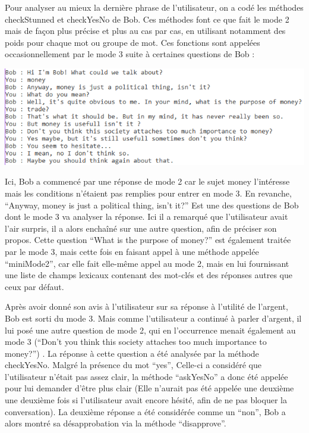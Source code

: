 \documentclass[paper=a4, 12pt]{report}
\begin{document}
\vspace{0.5cm}

Pour analyser au mieux la dernière phrase de l’utilisateur, on a codé les méthodes checkStunned et checkYesNo de Bob. Ces méthodes font ce que fait le mode 2 mais de façon plus précise et plus au cas par cas, en utilisant notamment des poids pour chaque mot ou groupe de mot. Ces fonctions sont appelées occasionnellement par le mode 3 suite à certaines questions de Bob :

\vspace{0.5cm}

\includegraphics[scale=0.5]{screen1.png}

\vspace{0.5cm}

Ici, Bob a commencé par une réponse de mode 2 car le sujet money l’intéresse mais les conditions n’étaient pas remplies pour entrer en mode 3. En revanche, “Anyway, money is just a political thing, isn’t it?” Est une des questions de Bob dont le mode 3 va analyser la réponse. Ici il a remarqué que l’utilisateur avait l’air surpris, il a alors enchaîné sur une autre question, afin de préciser son propos. Cette question “What is the purpose of money?” est également traitée par le mode 3, mais cette fois en faisant appel à une méthode appelée “miniMode2”, car elle fait elle-même appel au mode 2, mais en lui fournissant une liste de champs lexicaux contenant des mot-clés et des réponses autres que ceux par défaut.

\vspace{0.5cm}

Après avoir donné son avis à l’utilisateur sur sa réponse à l’utilité de l’argent, Bob est sorti du mode 3. Mais comme l’utilisateur a continué à parler d’argent, il lui posé une autre question de mode 2, qui en l’occurrence menait également au mode 3 (“Don’t you think this society attaches too much importance to money?”) . La réponse à cette question a été analysée par la méthode checkYesNo. Malgré la présence du mot “yes”, Celle-ci a considéré que l’utilisateur n’était pas assez clair, la méthode “askYesNo” a donc été appelée pour lui demander d’être plus clair (Elle n’aurait pas été appelée une deuxième une deuxième fois si l’utilisateur avait encore hésité, afin de ne pas bloquer la conversation). La deuxième réponse a été considérée comme un “non”, Bob a alors montré sa désapprobation via la méthode “disapprove”.
\end{document}

